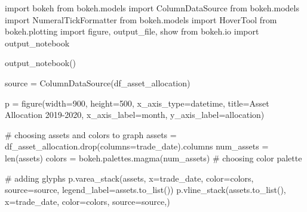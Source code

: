 \documentclass[
  letterpaper,
  DIV=11,
  numbers=noendperiod]{scrreprt}
\newenvironment{Shaded}{\begin{snugshade}}{\end{snugshade}}
\newcommand{\BuiltInTok}[1]{\textcolor[rgb]{0.00,0.23,0.31}{#1}}
\newcommand{\CommentTok}[1]{\textcolor[rgb]{0.37,0.37,0.37}{#1}}
\newcommand{\DecValTok}[1]{\textcolor[rgb]{0.68,0.00,0.00}{#1}}
\newcommand{\ImportTok}[1]{\textcolor[rgb]{0.00,0.46,0.62}{#1}}
\newcommand{\NormalTok}[1]{\textcolor[rgb]{0.00,0.23,0.31}{#1}}
\newcommand{\OperatorTok}[1]{\textcolor[rgb]{0.37,0.37,0.37}{#1}}
\newcommand{\StringTok}[1]{\textcolor[rgb]{0.13,0.47,0.30}{#1}}
\begin{document}
\begin{Shaded}
\begin{Highlighting}[]
\ImportTok{import}\NormalTok{ bokeh}
\ImportTok{from}\NormalTok{ bokeh.models }\ImportTok{import}\NormalTok{ ColumnDataSource}
\ImportTok{from}\NormalTok{ bokeh.models }\ImportTok{import}\NormalTok{ NumeralTickFormatter}
\ImportTok{from}\NormalTok{ bokeh.models }\ImportTok{import}\NormalTok{ HoverTool}
\ImportTok{from}\NormalTok{ bokeh.plotting }\ImportTok{import}\NormalTok{ figure, output\_file, show}
\ImportTok{from}\NormalTok{ bokeh.io }\ImportTok{import}\NormalTok{ output\_notebook}

\NormalTok{output\_notebook()}

\NormalTok{source }\OperatorTok{=}\NormalTok{ ColumnDataSource(df\_asset\_allocation)}

\NormalTok{p }\OperatorTok{=}\NormalTok{ figure(width}\OperatorTok{=}\DecValTok{900}\NormalTok{, height}\OperatorTok{=}\DecValTok{500}\NormalTok{, x\_axis\_type}\OperatorTok{=}\StringTok{\textquotesingle{}datetime\textquotesingle{}}\NormalTok{, title}\OperatorTok{=}\StringTok{\textquotesingle{}Asset Allocation 2019{-}2020\textquotesingle{}}\NormalTok{,}
\NormalTok{           x\_axis\_label}\OperatorTok{=}\StringTok{\textquotesingle{}month\textquotesingle{}}\NormalTok{, y\_axis\_label}\OperatorTok{=}\StringTok{\textquotesingle{}allocation\textquotesingle{}}\NormalTok{)}

\CommentTok{\# choosing assets and colors to graph}
\NormalTok{assets }\OperatorTok{=}\NormalTok{ df\_asset\_allocation.drop(columns}\OperatorTok{=}\StringTok{\textquotesingle{}trade\_date\textquotesingle{}}\NormalTok{).columns}
\NormalTok{num\_assets }\OperatorTok{=} \BuiltInTok{len}\NormalTok{(assets)}
\NormalTok{colors }\OperatorTok{=}\NormalTok{ bokeh.palettes.magma(num\_assets) }\CommentTok{\# choosing color palette}

\CommentTok{\# adding glyphs}
\NormalTok{p.varea\_stack(assets, x}\OperatorTok{=}\StringTok{\textquotesingle{}trade\_date\textquotesingle{}}\NormalTok{, color}\OperatorTok{=}\NormalTok{colors, source}\OperatorTok{=}\NormalTok{source, legend\_label}\OperatorTok{=}\NormalTok{assets.to\_list())}
\NormalTok{p.vline\_stack(assets.to\_list(), x}\OperatorTok{=}\StringTok{\textquotesingle{}trade\_date\textquotesingle{}}\NormalTok{, color}\OperatorTok{=}\NormalTok{colors, source}\OperatorTok{=}\NormalTok{source,)}


\end{Highlighting}
\end{Shaded}
\end{document}
